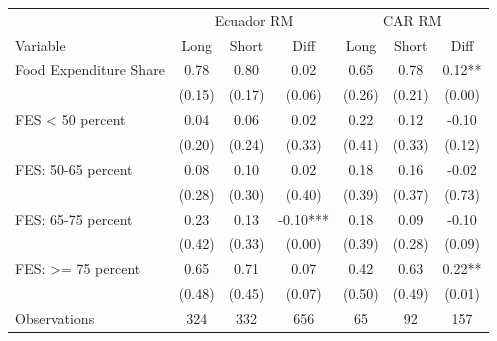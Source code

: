 \begin{tabular}{l*{6}c}
\hline\hline
 & \multicolumn{3}{c}{Ecuador RM} & \multicolumn{3}{c}{CAR RM}\\ 
Variable & Long & Short & Diff & Long & Short & Diff \\
\hline
Food Expenditure Share&0.78&0.80&0.02&0.65&0.78&0.12**\\
&(0.15)&(0.17)&(0.06)&(0.26)&(0.21)&(0.00)\\
FES < 50 percent&0.04&0.06&0.02&0.22&0.12&-0.10\\
&(0.20)&(0.24)&(0.33)&(0.41)&(0.33)&(0.12)\\
FES: 50-65 percent&0.08&0.10&0.02&0.18&0.16&-0.02\\
&(0.28)&(0.30)&(0.40)&(0.39)&(0.37)&(0.73)\\
FES: 65-75 percent&0.23&0.13&-0.10***&0.18&0.09&-0.10\\
&(0.42)&(0.33)&(0.00)&(0.39)&(0.28)&(0.09)\\
FES: >= 75 percent&0.65&0.71&0.07&0.42&0.63&0.22**\\
&(0.48)&(0.45)&(0.07)&(0.50)&(0.49)&(0.01)\\
\hline
Observations & 324 & 332 & 656 & 65 & 92 & 157 \\
\hline\hline
\end{tabular}

